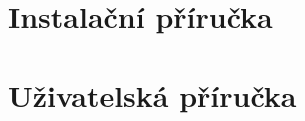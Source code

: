 \documentclass[thesis=M,czech]{FITthesis}[2012/06/26]
\begin{document}
\chapter{Instalační příručka}

\chapter{Uživatelská příručka}


% 
% 
% 
% 
% 
\end{document}
